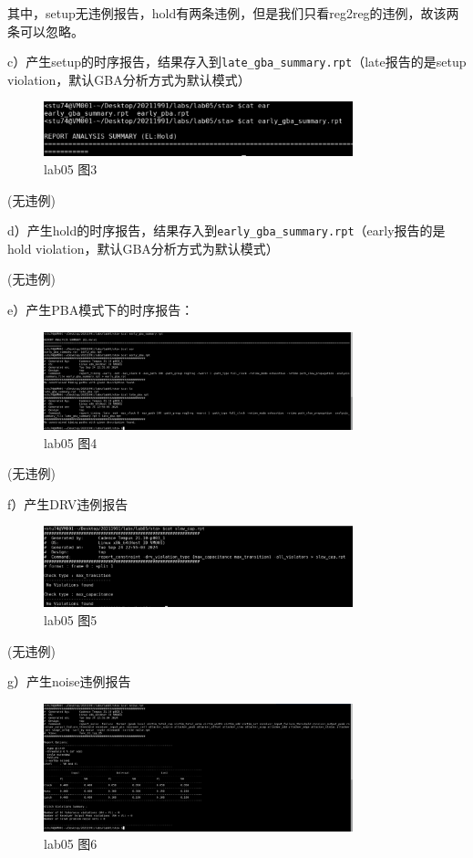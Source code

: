 其中，setup无违例报告，hold有两条违例，但是我们只看reg2reg的违例，故该两条可以忽略。

c）产生setup的时序报告，结果存入到\texttt{late\_gba\_summary.rpt}（late报告的是setup violation，默认GBA分析方式为默认模式）

\begin{figure}[H]
    \centering
    \includegraphics[width=0.8\textwidth]{images/lab05-03.png}
    \caption{lab05 图3}
\end{figure}

(无违例)

d）产生hold的时序报告，结果存入到\texttt{early\_gba\_summary.rpt}（early报告的是hold violation，默认GBA分析方式为默认模式）
 
(无违例)

e）产生PBA模式下的时序报告：
 
\begin{figure}[H]
    \centering
    \includegraphics[width=0.8\textwidth]{images/lab05-04.png}
    \caption{lab05 图4}
\end{figure} 
 
(无违例)

f）产生DRV违例报告

\begin{figure}[H]
    \centering
    \includegraphics[width=0.8\textwidth]{images/lab05-05.png}
    \caption{lab05 图5}
\end{figure}
 
(无违例)

g）产生noise违例报告

\begin{figure}[H]
    \centering
    \includegraphics[width=0.8\textwidth]{images/lab05-06.png}
    \caption{lab05 图6}
\end{figure}

